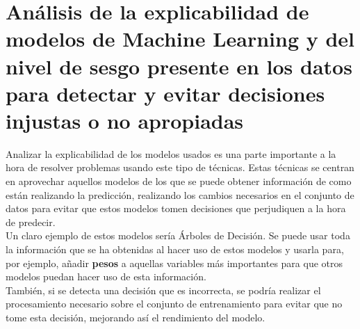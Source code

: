 \section*{Análisis de la explicabilidad de modelos de Machine Learning y del nivel de sesgo presente en los datos para detectar y evitar decisiones injustas o no apropiadas}
Analizar la explicabilidad de los modelos usados es una parte importante a la hora de resolver problemas usando este tipo de técnicas. Estas técnicas se centran en aprovechar aquellos modelos de los que se puede obtener información de como están realizando la predicción, realizando los cambios necesarios en el conjunto de datos para evitar que estos modelos  tomen decisiones que perjudiquen a la hora de predecir.\\
\linebreak
Un claro ejemplo de estos modelos sería Árboles de Decisión. Se puede usar toda la información que se ha obtenidas al hacer uso de estos modelos y usarla para, por ejemplo, añadir \textbf{pesos} a aquellas variables más importantes para que otros modelos puedan hacer uso de esta información.\\
También, si se detecta una decisión que es incorrecta, se podría realizar el procesamiento necesario sobre el conjunto de entrenamiento para evitar que no tome esta decisión, mejorando así el rendimiento del modelo.